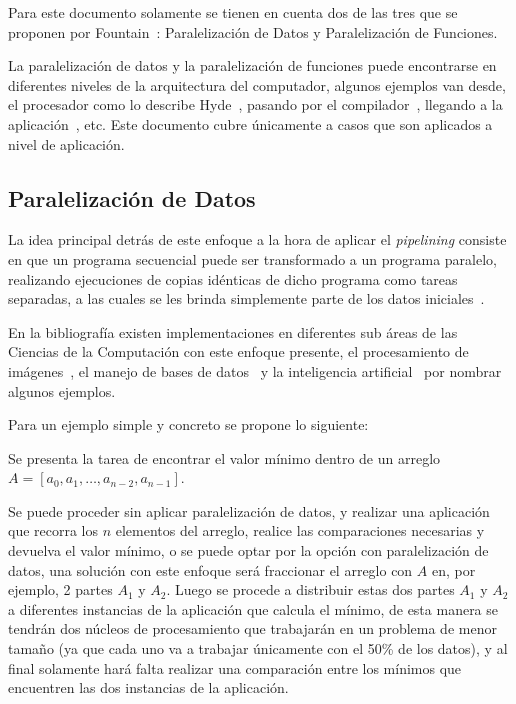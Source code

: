 Para este documento solamente se tienen en cuenta dos de las tres que se 
proponen por Fountain~\cite{fountain1994}: Paralelización de Datos y
Paralelización de Funciones.

La paralelización de datos y la paralelización de funciones puede encontrarse 
en diferentes niveles de la arquitectura
del computador, algunos ejemplos van desde, el procesador como lo describe
Hyde~\cite{fountain1994}, pasando por el compilador~\cite{clark1997}, llegando
a la aplicación~\cite{wolters1995}, etc. Este 
documento cubre únicamente a casos que son aplicados a nivel de aplicación.

\subsection{Paralelización de Datos}
\label{ssec:paralelizacion_de_datos}

\begin{tcolorbox}
La idea principal detrás de este enfoque a la hora de aplicar el {\it pipelining}
consiste en que un programa secuencial puede ser transformado a un
programa paralelo, realizando ejecuciones de copias idénticas de dicho programa como
tareas separadas, a las cuales se les brinda simplemente parte de los datos
iniciales~\cite{haveraaen2000}.
\end{tcolorbox}




En la bibliografía existen implementaciones en diferentes sub áreas de las Ciencias de la
Computación con este enfoque presente, el procesamiento de
imágenes~\cite{pang2009}, el manejo de bases de
datos~\cite{zakharov2019} y la inteligencia artificial~\cite{hajj2015} por
nombrar algunos ejemplos. 

Para un ejemplo simple y concreto se propone lo siguiente: 

\begin{tcolorbox} \label{ej:1} 
  Se presenta la tarea de encontrar el valor mínimo dentro de un arreglo 
  $A = [a_{0}, a_{1}, \ldots , a_{n-2}, a_{n-1}]$.
\end{tcolorbox}

Se puede proceder sin aplicar paralelización de datos, y realizar una
aplicación que recorra los $n$ elementos del arreglo, realice las
comparaciones necesarias y devuelva el valor mínimo, o se puede
optar por la opción con paralelización de datos, una solución con este enfoque 
será fraccionar el arreglo con $A$ en, por ejemplo, 2 partes $A_{1}$ y
$A_{2}$. Luego se procede a distribuir estas dos partes $A_{1}$ y
$A_{2}$ a diferentes instancias de la aplicación que calcula el mínimo, 
de esta manera se tendrán dos núcleos de procesamiento que trabajarán en un
problema de menor tamaño (ya que
cada uno va a trabajar únicamente con el 50\% de los datos), y al final
solamente hará falta realizar una comparación entre los mínimos que
encuentren las dos instancias de la aplicación.

